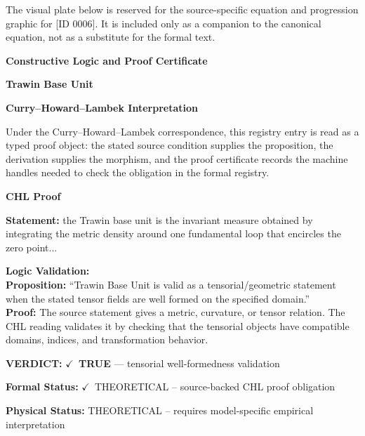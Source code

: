 \begingroup\footnotesize\sloppy
The visual plate below is reserved for the source-specific equation and progression graphic for [ID 0006]. It is included only as a companion to the canonical equation, not as a substitute for the formal text.
\par\endgroup
\ifTZPDarkEdition
{}
\fi

\clearpage
\begingroup\tzpsupportsetup
\noindent\textbf{\fontsize{10.8pt}{12.8pt}\selectfont [ID 0006] Constructive Logic and Proof Certificate}\par
\noindent\textbf{\fontsize{10pt}{12pt}\selectfont Trawin Base Unit}\par
\vspace{0.45em}
\begingroup
\footnotesize
\setlength{\parskip}{0.22em}
\setlength{\parindent}{0pt}
\noindent\textbf{Curry--Howard--Lambek Interpretation}\par
Under the Curry--Howard--Lambek correspondence, this registry entry is read as a typed proof
object: the stated source condition supplies the proposition, the derivation supplies the
morphism, and the proof certificate records the machine handles needed to check the obligation
in the formal registry.

\vspace{0.45em}
\noindent\textbf{CHL Proof}\par
\textbf{Statement:} the Trawin base unit is the invariant measure obtained by integrating the metric density
around one fundamental loop that encircles the zero point...

\textbf{Logic Validation:}\\
\textbf{Proposition:} ``Trawin Base Unit is valid as a tensorial/geometric statement when the stated tensor
fields are well formed on the specified domain.''\\
\textbf{Proof:} The source statement gives a metric, curvature, or tensor relation. The CHL reading
validates it by checking that the tensorial objects have compatible domains, indices,
and transformation behavior.

\textbf{VERDICT:} \ensuremath{\checkmark}\ \textbf{TRUE} --- tensorial well-formedness validation

\textbf{Formal Status:} \ensuremath{\checkmark}\ THEORETICAL -- source-backed CHL proof obligation

\textbf{Physical Status:} THEORETICAL -- requires model-specific empirical interpretation
\par\vspace{0.45em}
\par
\ifTZPDarkEdition
{}
\fi
\endgroup
\endgroup
